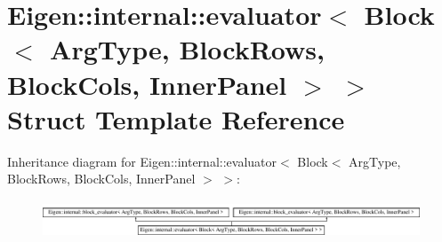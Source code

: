 \hypertarget{struct_eigen_1_1internal_1_1evaluator_3_01_block_3_01_arg_type_00_01_block_rows_00_01_block_cols_00_01_inner_panel_01_4_01_4}{}\section{Eigen\+:\+:internal\+:\+:evaluator$<$ Block$<$ Arg\+Type, Block\+Rows, Block\+Cols, Inner\+Panel $>$ $>$ Struct Template Reference}
\label{struct_eigen_1_1internal_1_1evaluator_3_01_block_3_01_arg_type_00_01_block_rows_00_01_block_cols_00_01_inner_panel_01_4_01_4}
Inheritance diagram for Eigen\+:\+:internal\+:\+:evaluator$<$ Block$<$ Arg\+Type, Block\+Rows, Block\+Cols, Inner\+Panel $>$ $>$\+:\begin{figure}[H]
\begin{center}
\leavevmode
\includegraphics[height=1.138211cm]{struct_eigen_1_1internal_1_1evaluator_3_01_block_3_01_arg_type_00_01_block_rows_00_01_block_cols_00_01_inner_panel_01_4_01_4}
\end{center}
\end{figure}
